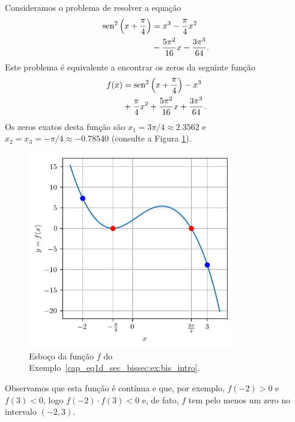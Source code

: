 \begin{ex}\label{cap_eq1d_sec_bissec:ex:bis_intro}
  Consideramos o problema de resolver a equação
  \begin{equation}
    \begin{aligned}
      \operatorname{sen}^2\left(x+\frac{\pi}{4}\right) &= x^3 - \frac{\pi}{4}x^2\\
      &- \frac{5\pi^2}{16}x - \frac{3\pi^3}{64}.
    \end{aligned}
\end{equation}
Este problema é equivalente a encontrar os zeros da seguinte função
\begin{equation}
  \begin{aligned}
    f(x) &= \operatorname{sen}^2\left(x+\frac{\pi}{4}\right) - x^3 \\
         &+ \frac{\pi}{4}x^2 + \frac{5\pi^2}{16}x + \frac{3\pi^3}{64}.
  \end{aligned}
\end{equation}
Os zeros exatos desta função são $x_1=3\pi/4\approx 2.3562$ e $x_2=x_3=-\pi/4\approx -0.78540$ (consulte a Figura \ref{cap_eq1d_sec_bissec:fig:bis_intro}).

\begin{figure}[H]
  \centering
  \includegraphics[width=0.8\textwidth]{./cap_eq1d/dados/fig_bis_intro/fig}
  \caption{Esboço da função $f$ do Exemplo~\ref{cap_eq1d_sec_bissec:ex:bis_intro}.}
  \label{cap_eq1d_sec_bissec:fig:bis_intro}
\end{figure}

Observamos que esta função é contínua e que, por exemplo, $f(-2)>0$ e $f(3)<0$, logo $f(-2)\cdot f(3) < 0$ e, de fato, $f$ tem pelo menos um zero no intervalo $(-2, 3)$.
\end{ex}

